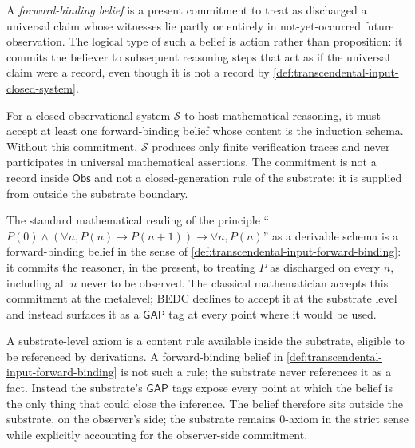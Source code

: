 \begin{definition}
\label{def:transcendental-input-forward-binding}
A \emph{forward-binding belief} is a present commitment to treat as discharged a universal claim whose witnesses lie partly or entirely in not-yet-occurred future observation. The logical type of such a belief is action rather than proposition: it commits the believer to subsequent reasoning steps that act as if the universal claim were a record, even though it is not a record by \autoref{def:transcendental-input-closed-system}.
\end{definition}

\begin{principle}
\label{prin:transcendental-input-minimum-necessity}
For a closed observational system $\mathcal{S}$ to host mathematical reasoning, it must accept at least one forward-binding belief whose content is the induction schema. Without this commitment, $\mathcal{S}$ produces only finite verification traces and never participates in universal mathematical assertions. The commitment is not a record inside $\mathsf{Obs}$ and not a closed-generation rule of the substrate; it is supplied from outside the substrate boundary.
\end{principle}

\begin{example}
\label{ex:transcendental-input-belief-in-induction}
The standard mathematical reading of the principle ``$P(0) \wedge (\forall n, P(n) \to P(n+1)) \to \forall n, P(n)$'' as a derivable schema is a forward-binding belief in the sense of \autoref{def:transcendental-input-forward-binding}: it commits the reasoner, in the present, to treating $P$ as discharged on every $n$, including all $n$ never to be observed. The classical mathematician accepts this commitment at the metalevel; BEDC declines to accept it at the substrate level and instead surfaces it as a $\mathsf{GAP}$ tag at every point where it would be used.
\end{example}

\begin{remark}
\label{rem:transcendental-input-not-axiom}
A substrate-level axiom is a content rule available inside the substrate, eligible to be referenced by derivations. A forward-binding belief in \autoref{def:transcendental-input-forward-binding} is not such a rule; the substrate never references it as a fact. Instead the substrate's $\mathsf{GAP}$ tags expose every point at which the belief is the only thing that could close the inference. The belief therefore sits outside the substrate, on the observer's side; the substrate remains 0-axiom in the strict sense while explicitly accounting for the observer-side commitment.
\end{remark}

